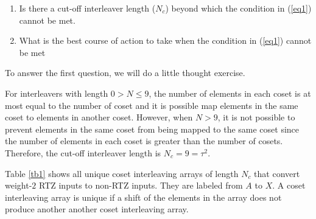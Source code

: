 \documentclass[11pt, oneside, dvipdfmx]{book}
\begin{document}
\begin{enumerate}
\item Is there a cut-off interleaver length ($N_c$) beyond which the condition in (\ref{eq1}) cannot be met.

\item What is the best course of action to take when the condition
 in (\ref{eq1}) cannot be met
\end{enumerate}

To answer the first question, we will do a little thought exercise. 

For interleavers with length $0>N\leq 9$, the number of elements in each coset is at most equal to the number of coset and it is possible map elements in the same coset to elements in another coset.
However, when $N>9$, it is not possible to prevent elements in the same coset from being mapped to the same coset since the number of elements in each coset is greater than the number of cosets. Therefore, the cut-off interleaver length is $N_c=9=\tau^2$.

Table \ref{tb1} shows all unique coset interleaving arrays of length $N_c$ that convert weight-$2$ RTZ inputs to non-RTZ inputs. They are labeled from $A$ to $X$. A coset interleaving array is unique if a shift of the elements in the array does not produce another another coset interleaving array.
\end{document}
